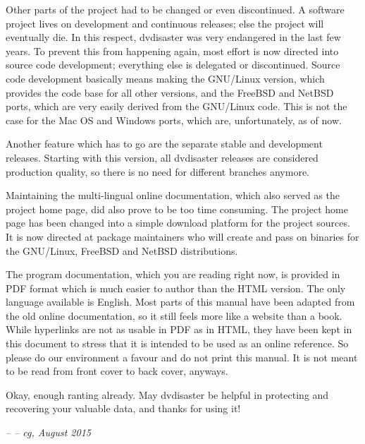 \smallskip

Other parts of the project had to be changed or even
discontinued. A software project lives on development
and continuous releases; else the
project will eventually die. In this respect, dvdisaster
was very endangered in the last few years.
To prevent this from happening again, most effort
is now directed into source code development;
everything else is delegated or discontinued.
Source code development basically means making
the GNU/Linux version, which provides the code base
for all other versions, and the FreeBSD and NetBSD ports,
which are very easily derived from the GNU/Linux code.
This is not the case for the Mac OS and Windows ports,
which are, unfortunately,  as of now.

Another feature which has to go are the separate
stable and development releases.
Starting with this version, all dvdisaster releases
are considered production quality, so there is no
need for different branches anymore.

\smallskip

Maintaining the multi-lingual online documentation, which
also served as the project home page, did also prove to
be too time consuming. The project home page has
been changed into a simple download platform for
the project sources. It is now directed at package
maintainers who will create and pass on binaries
for the GNU/Linux, FreeBSD and NetBSD distributions.

The program documentation, which you are reading
right now, is provided in PDF format which is much
easier to author than the HTML version. The only
language available is English. Most parts of this
manual have been adapted from the old online
documentation, so it still feels more like a website
than a book. While hyperlinks are not as usable in PDF
as in HTML, they have been kept in this document to
stress that it is intended to be used as an online reference.
So please do our environment a favour and do not print
this manual. It is not meant to be read
from front cover to back cover, anyways.

\smallskip

Okay, enough ranting already. May dvdisaster be helpful
in protecting and recovering your valuable data,
and thanks for using it!

\bigskip

{\em -- -- cg, August 2015}


